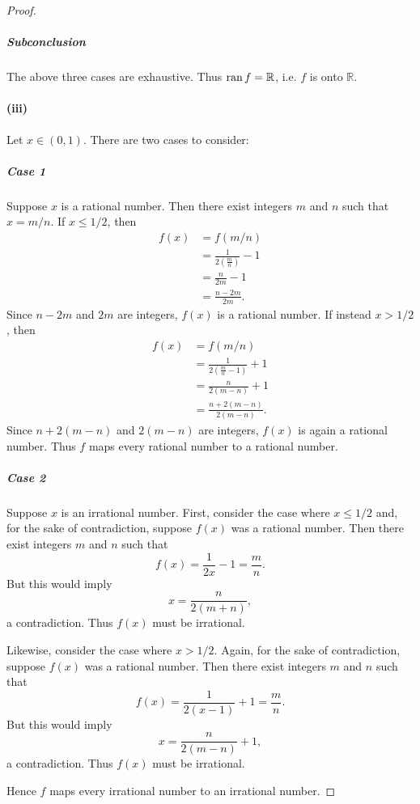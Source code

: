 \documentclass{report}
\begin{document}
\begin{proof}
      \subparagraph{Subconclusion}%

        The above three cases are exhaustive.
        Thus $\mathop{\text{ran}}{f} = \mathbb{R}$, i.e. $f$ is onto $\mathbb{R}$.

    \paragraph{(iii)}%

      Let $x \in (0, 1)$.
      There are two cases to consider:

      \subparagraph{Case 1}%

        Suppose $x$ is a rational number.
        Then there exist integers $m$ and $n$ such that $x = m / n$.
        If $x \leq 1 / 2$, then
          \begin{align*}
            f(x)
              & = f(m / n) \\
              & = \frac{1}{2\left(\frac{m}{n}\right)} - 1 \\
              & = \frac{n}{2m} - 1 \\
              & = \frac{n - 2m}{2m}.
          \end{align*}
        Since $n - 2m$ and $2m$ are integers, $f(x)$ is a rational number.
        If instead $x > 1 / 2$, then
          \begin{align*}
            f(x)
              & = f(m / n) \\
              & = \frac{1}{2\left(\frac{m}{n} - 1\right)} + 1 \\
              & = \frac{n}{2(m - n)} + 1 \\
              & = \frac{n + 2(m - n)}{2(m - n)}.
          \end{align*}
        Since $n + 2(m - n)$ and $2(m - n)$ are integers, $f(x)$ is again a
          rational number.
        Thus $f$ maps every rational number to a rational number.

      \subparagraph{Case 2}%

        Suppose $x$ is an irrational number.
        First, consider the case where $x \leq 1 / 2$ and, for the sake of
          contradiction, suppose $f(x)$ was a rational number.
        Then there exist integers $m$ and $n$ such that
          $$f(x) = \frac{1}{2x} - 1 = \frac{m}{n}.$$
        But this would imply $$x = \frac{n}{2(m + n)},$$ a contradiction.
        Thus $f(x)$ must be irrational.

        Likewise, consider the case where $x > 1 / 2$.
        Again, for the sake of contradiction, suppose $f(x)$ was a rational
          number.
        Then there exist integers $m$ and $n$ such that
          $$f(x) = \frac{1}{2(x - 1)} + 1 = \frac{m}{n}.$$
        But this would imply $$x = \frac{n}{2(m - n)} + 1,$$ a contradiction.
        Thus $f(x)$ must be irrational.

        Hence $f$ maps every irrational number to an irrational number.

  \end{proof}
\end{document}
